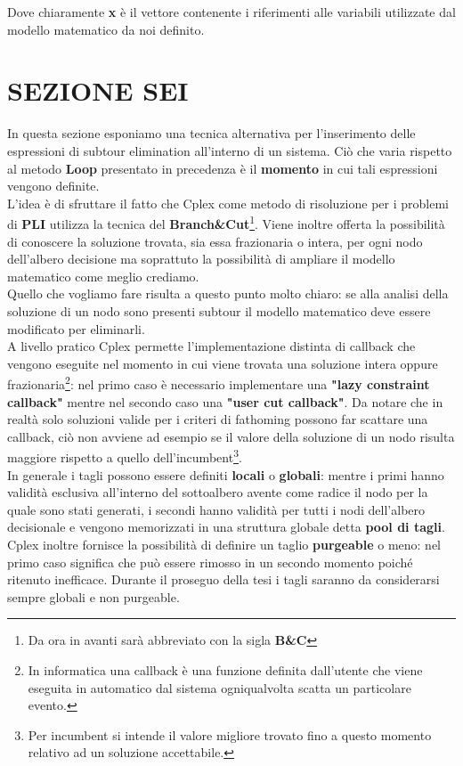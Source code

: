 \documentclass[11pt]{article}
\begin{document}
Dove chiaramente \textbf{x} è il vettore contenente i riferimenti alle variabili utilizzate dal modello matematico da noi definito.

\section*{SEZIONE SEI}

In questa sezione esponiamo una tecnica alternativa per l'inserimento delle espressioni di subtour elimination all'interno di un sistema. Ciò che varia rispetto al metodo \textbf{Loop} presentato in precedenza è il \textbf{momento} in cui tali espressioni vengono definite.\\
L'idea è di sfruttare il fatto che Cplex come metodo di risoluzione per i problemi di \textbf{PLI} utilizza la tecnica del \textbf{Branch\&Cut}\footnote{Da ora in avanti sarà abbreviato con la sigla \textbf{B\&C}}. Viene inoltre offerta la possibilità di conoscere la soluzione trovata, sia essa frazionaria o intera, per ogni nodo dell'albero decisione ma soprattuto la possibilità di ampliare il modello matematico come meglio crediamo.\\
Quello che vogliamo fare risulta a questo punto molto chiaro: se alla analisi della soluzione di un nodo sono presenti subtour il modello matematico deve essere modificato per eliminarli.\\
A livello pratico Cplex permette l'implementazione distinta di callback che vengono eseguite nel momento in cui viene trovata una soluzione intera oppure frazionaria\footnote{In informatica una callback è una funzione definita dall'utente che viene eseguita in automatico dal sistema ogniqualvolta scatta un particolare evento.}: nel primo caso è necessario implementare una \textbf{"lazy constraint callback"} mentre nel secondo caso una \textbf{"user cut callback"}. Da notare che in realtà solo soluzioni valide per i criteri di fathoming possono far scattare una callback, ciò non avviene ad esempio se il valore della soluzione di un nodo risulta maggiore rispetto a quello dell'incumbent\footnote{Per incumbent si intende il valore migliore trovato fino a questo momento relativo ad un soluzione accettabile.}.\\
In generale i tagli possono essere definiti \textbf{locali} o \textbf{globali}: mentre i primi hanno validità esclusiva all'interno del sottoalbero avente come radice il nodo per la quale sono stati generati, i secondi hanno validità per tutti i nodi dell'albero decisionale e vengono memorizzati in una struttura globale detta \textbf{pool di tagli}. Cplex inoltre fornisce la possibilità di definire un taglio \textbf{purgeable} o meno: nel primo caso significa che può essere rimosso in un secondo momento poiché ritenuto inefficace. Durante il proseguo della tesi i tagli saranno da considerarsi sempre globali e non purgeable.
\end{document}
